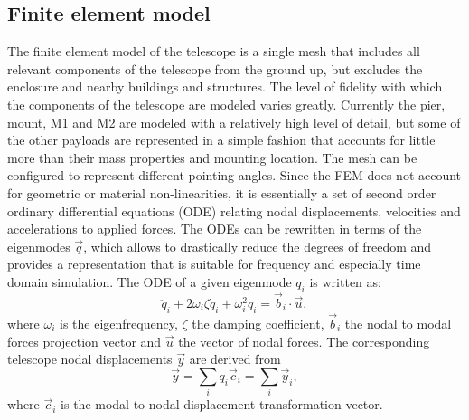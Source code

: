\documentclass{gmto}
\begin{document}
\subsection{Finite element model}
The finite element model of the telescope\cite{ss2fem_Christoph2020} is a single mesh that includes all relevant components of the telescope from the ground up, but excludes the enclosure and nearby buildings and structures. 
The level of fidelity with which the components of the telescope are modeled varies greatly. 
Currently the pier, mount, M1 and M2 are modeled with a relatively high level of detail, but some of the other payloads are represented in a simple fashion that accounts for little more than their mass properties and mounting location. 
The mesh can be configured to represent different pointing angles.
Since the FEM does not account for geometric or material non-linearities, it is essentially a set of second order ordinary differential equations (ODE) relating nodal displacements, velocities and accelerations to
applied forces.
The ODEs can be rewritten in terms of the eigenmodes $\vec q$, which allows to drastically reduce the degrees of freedom and provides a representation that is suitable for frequency and especially time domain simulation.
The ODE of a given eigenmode $q_i$ is written as:
\begin{equation}
  \label{eq:1}
  \ddot q_i + 2\omega_i\zeta\dot q_i + \omega_i^2 q_i = \vec b_i\cdot \vec u,
\end{equation}
where $\omega_i$ is the eigenfrequency, $\zeta$ the damping coefficient, $\vec b_i$
the nodal to modal forces projection vector and $\vec u$ the vector of nodal forces.
The corresponding telescope nodal displacements $\vec y$ are derived from
\begin{equation}
  \label{eq:2}
  \vec y = \sum_i q_i\vec c_i  = \sum_i \vec y_i,
\end{equation}
where $\vec c_i$ is the modal to nodal displacement transformation vector.
\end{document}
